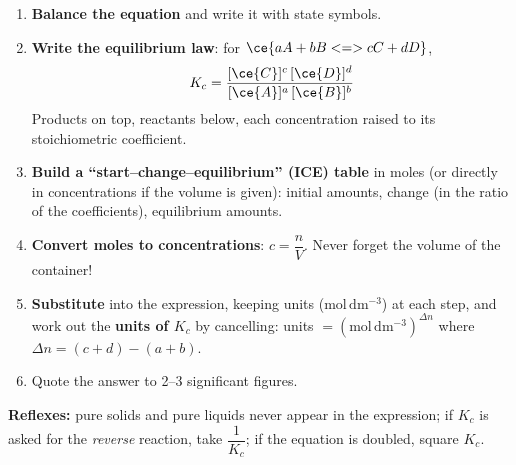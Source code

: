\documentclass[11pt]{article}
\newcommand{\cle}[1]{{\popxbold\color{popdark}#1}}
\begin{document}
\begin{methode}
\begin{enumerate}
\item \textbf{Balance the equation} and write it with state symbols.
\item \textbf{Write the equilibrium law}: for $\ce{aA + bB <=> cC + dD}$,
\[K_c=\dfrac{[\ce{C}]^c\,[\ce{D}]^d}{[\ce{A}]^a\,[\ce{B}]^b}\]
Products on top, reactants below, each concentration raised to its \cle{stoichiometric coefficient}.
\item \textbf{Build a ``start--change--equilibrium'' (ICE) table} in moles (or directly in concentrations if the volume is given): initial amounts, change (in the ratio of the coefficients), equilibrium amounts.
\item \textbf{Convert moles to concentrations}: $c=\dfrac{n}{V}$. Never forget the volume of the container!
\item \textbf{Substitute} into the expression, keeping units ($\mathrm{mol\,dm^{-3}}$) at each step, and work out the \textbf{units of $K_c$} by cancelling: units $=(\mathrm{mol\,dm^{-3}})^{\Delta n}$ where $\Delta n = (c+d)-(a+b)$.
\item Quote the answer to 2--3 significant figures.
\end{enumerate}
\textbf{Reflexes:} pure solids and pure liquids never appear in the expression; if $K_c$ is asked for the \emph{reverse} reaction, take $\dfrac{1}{K_c}$; if the equation is doubled, square $K_c$.
\end{methode}
\end{document}
